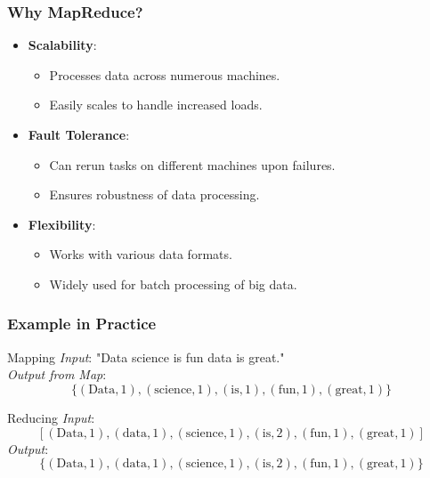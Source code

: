 \documentclass[aspectratio=169]{beamer}
\begin{document}
\begin{frame}[fragile]
    \frametitle{Why MapReduce?}
    \begin{itemize}
        \item \textbf{Scalability}:
            \begin{itemize}
                \item Processes data across numerous machines.
                \item Easily scales to handle increased loads.
            \end{itemize}
        \item \textbf{Fault Tolerance}:
            \begin{itemize}
                \item Can rerun tasks on different machines upon failures.
                \item Ensures robustness of data processing.
            \end{itemize}
        \item \textbf{Flexibility}:
            \begin{itemize}
                \item Works with various data formats.
                \item Widely used for batch processing of big data.
            \end{itemize}
    \end{itemize}
\end{frame}

\begin{frame}[fragile]
    \frametitle{Example in Practice}
    \begin{block}{Mapping}
        \textit{Input}: "Data science is fun data is great." \\
        \textit{Output from Map}: 
        \[
        \{(\text{Data}, 1), (\text{science}, 1), (\text{is}, 1), (\text{fun}, 1), (\text{great}, 1)\}
        \]
    \end{block}
    
    \begin{block}{Reducing}
        \textit{Input}:
        \[
        [(\text{Data}, 1), (\text{data}, 1), (\text{science}, 1), (\text{is}, 2), (\text{fun}, 1), (\text{great}, 1)]
        \]
        \textit{Output}:
        \[
        \{(\text{Data}, 1), (\text{data}, 1), (\text{science}, 1), (\text{is}, 2), (\text{fun}, 1), (\text{great}, 1)\}
        \]
    \end{block}
\end{frame}
\end{document}

